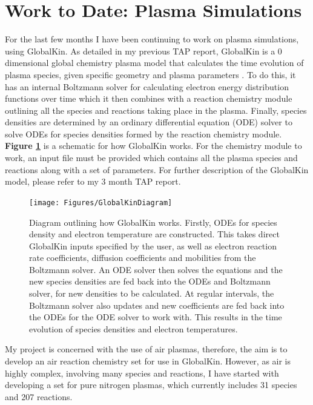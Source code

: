 \documentclass[11pt, oneside]{article}   	%
\begin{document}
\section{Work to Date: Plasma Simulations}

For the last few months I have been continuing to work on plasma simulations, using GlobalKin.
As detailed in my previous TAP report, GlobalKin is a 0 dimensional global chemistry plasma model that calculates the time evolution of plasma species, given specific geometry and plasma parameters \cite{Stafford2004O2}.
To do this, it has an internal Boltzmann solver for calculating electron energy distribution functions over time which it then combines with a reaction chemistry module outlining all the species and reactions taking place in the plasma.
Finally, species densities are determined by an ordinary differential equation (ODE) solver to solve ODEs for species densities formed by the reaction chemistry module.
\textbf{Figure \ref{fig:GlobalKin}} is a schematic for how GlobalKin works.
For the chemistry module to work, an input file must be provided which contains all the plasma species and reactions along with a set of parameters.
For further description of the GlobalKin model, please refer to my 3 month TAP report.


\begin{figure}
\texttt{[image: Figures/GlobalKinDiagram]}
\caption{Diagram outlining how GlobalKin works. Firstly, ODEs for species density and electron temperature are constructed. This takes direct GlobalKin inputs specified by the user, as well as electron reaction rate coefficients, diffusion coefficients and mobilities from the Boltzmann solver. An ODE solver then solves the equations and the new species densities are fed back into the ODEs and Boltzmann solver, for new densities to be calculated. At regular intervals, the Boltzmann solver also updates and new coefficients are fed back into the ODEs for the ODE solver to work with. This results in the time evolution of species densities and electron temperatures.}
\label{fig:GlobalKin}
\end{figure}



My project is concerned with the use of air plasmas, therefore, the aim is to develop an air reaction chemistry set for use in GlobalKin.
However, as air is highly complex, involving many species and reactions, I have started with developing a set for pure nitrogen plasmas, which currently includes 31 species and 207 reactions.
\end{document}
